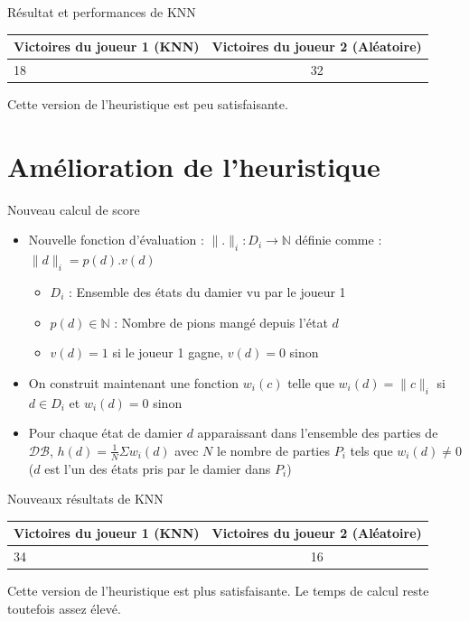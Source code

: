 \documentclass{beamer}
\begin{document}
\begin{frame}{Résultat et performances de KNN}
    \begin{center}
        \begin{tabular}{ | l | c | }
            \hline
            Victoires du joueur 1 (KNN) & Victoires du joueur 2 (Aléatoire) \\ \hline
            18                          & 32                                \\ \hline
        \end{tabular}
    \end{center}
    Cette version de l'heuristique est peu satisfaisante.
\end{frame}

{\section{Amélioration de l'heuristique}}

\begin{frame}{Nouveau calcul de score}
    \begin{itemize}
        \item Nouvelle fonction d'évaluation : \newline
              $\lVert.\rVert_i : D_i \to \mathbb{N}$ définie comme : $\lVert d \rVert_i = p(d).v(d)$
              \begin{itemize}
                  \item $D_i$ : Ensemble des états du damier vu par le joueur 1
                  \item $p(d) \in \mathbb{N}$ : Nombre de pions mangé depuis l'état $d$
                  \item  $v(d) = 1$ si le joueur 1 gagne, $v(d) = 0$ sinon
              \end{itemize}
        \item On construit maintenant une fonction $w_i(c)$ telle que $w_i(d) = \lVert c \lVert_i$ si $d \in D_i$ et $w_i(d) = 0$ sinon
        \item Pour chaque état de damier $d$ apparaissant dans l'ensemble des parties de $\mathcal{DB}$, $h(d) = \frac{1}{N}\Sigma w_i(d)$ avec $N$ le nombre de parties $P_i$ tels que $w_i(d) \neq 0$ ($d$ est l'un des états pris par le damier dans $P_i$)
    \end{itemize}
\end{frame}

\begin{frame}{Nouveaux résultats de KNN}
    \begin{center}
        \begin{tabular}{ | l | c | }
            \hline
            Victoires du joueur 1 (KNN) & Victoires du joueur 2 (Aléatoire) \\ \hline
            34                          & 16                                \\ \hline
        \end{tabular}
    \end{center}
    Cette version de l'heuristique est plus satisfaisante. \newline
    Le temps de calcul reste toutefois assez élevé.
\end{frame}
\end{document}

